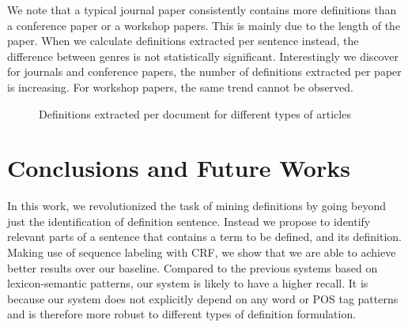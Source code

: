 \documentclass[hyp]{socreport}
\begin{document}
We note that a typical journal paper consistently contains more definitions than a conference paper or a workshop papers. This is mainly due to the length of the paper. When we calculate definitions extracted per sentence instead, the difference between genres is not statistically significant. Interestingly we discover for journals and conference papers, the number of definitions extracted per paper is increasing. For workshop papers, the same trend cannot be observed. 
    
\begin{figure}
\centering
\caption{Definitions extracted per document for different types of articles}
\label{plot}
\end{figure}


\chapter{Conclusions and Future Works}

In this work, we revolutionized the task of mining definitions by going beyond just the identification of definition sentence. Instead we propose to identify relevant parts of a sentence that contains a term to be defined, and its definition. Making use of sequence labeling with CRF, we show that we are able to achieve better results over our baseline. Compared to the previous systems based on lexicon-semantic patterns, our system is likely to have a higher recall. It is because our system does not explicitly depend on any word or POS tag patterns and is therefore more robust to different types of definition formulation. 
\end{document}
